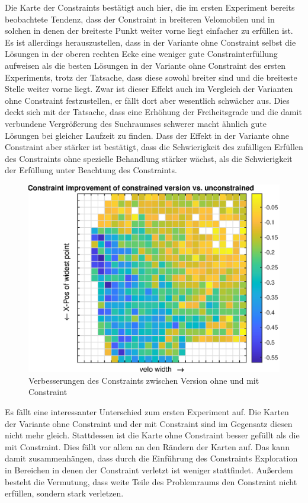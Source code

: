 Die Karte der Constraints bestätigt auch hier, die im ersten Experiment bereits beobachtete Tendenz, dass der Constraint in breiteren Velomobilen und in solchen in denen der breiteste Punkt weiter vorne liegt einfacher zu erfüllen ist.
Es ist allerdings herauszustellen, dass in der Variante ohne Constraint selbst die Lösungen in der oberen rechten Ecke eine weniger gute Constrainterfüllung aufweisen als die besten Lösungen in der Variante ohne Constraint des ersten Experiments, trotz der Tatsache, dass diese sowohl breiter sind und die breiteste Stelle weiter vorne liegt.
Zwar ist dieser Effekt auch im Vergleich der Varianten ohne Constraint festzustellen, er fällt dort aber wesentlich schwächer aus.
Dies deckt sich mit der Tatsache, dass eine Erhöhung der Freiheitsgrade und die damit verbundene Vergrößerung des Suchraumses schwerer macht ähnlich gute Lösungen bei gleicher Laufzeit zu finden.
Dass der Effekt in der Variante ohne Constraint aber stärker ist bestätigt, dass die Schwierigkeit des zufälligen Erfüllen des Constraints ohne spezielle Behandlung stärker wächst, als die Schwierigkeit der Erfüllung unter Beachtung des Constraints.

\begin{figure}[h]
	\centering
	\includegraphics[width=.7\linewidth]{bilder/6pt500Samples/constraintImprovements}
	\caption{Verbesserungen des Constraints zwischen Version ohne und mit Constraint}
	\label{fig:2ndmapConCompare}
\end{figure}

Es fällt eine interessanter Unterschied zum ersten Experiment auf.
Die Karten der Variante ohne Constraint und der mit Constraint sind im Gegensatz diesen nicht mehr gleich.
Stattdessen ist die Karte ohne Constraint besser gefüllt als die mit Constraint.
Dies fällt vor allem an den Rändern der Karten auf.
Das kann damit zusammenhängen, dass durch die Einführung des Constraints Exploration in Bereichen in denen der Constraint verletzt ist weniger stattfindet.
Außerdem besteht die Vermutung, dass weite Teile des Problemraums den Constraint nicht erfüllen, sondern stark verletzen.

